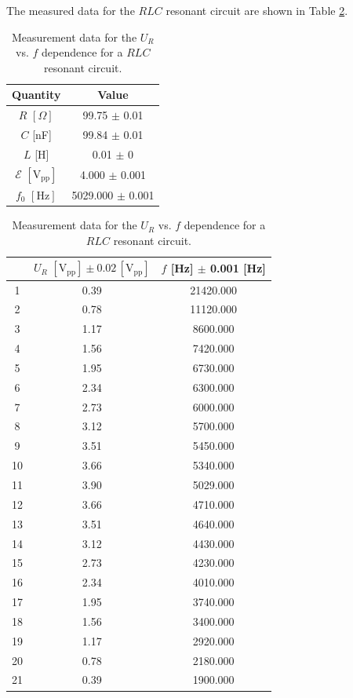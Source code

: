 \documentclass{article}
\begin{document}
The measured data for the $RLC$ resonant circuit are shown in Table \ref{TableResonant}.
\begin{table}[H]\centering
 \begin{tabular}{c|c}
    \toprule
            Quantity & Value \\
        \midrule
        $R\,\,[\Omega]$ & 99.75 $\pm$ 0.01 \\        
        $C$ [nF] & 99.84 $\pm$ 0.01 \\
        $L$ [H] & 0.01 $\pm$ 0 \\
        \midrule
        $\mathcal{E}\,\,[\text{V}_{\text{pp}}]$ & 4.000 $\pm$ 0.001    \\
        $f_0\,\,[\text{Hz}]$ & 5029.000 $\pm$ 0.001 \\
    \end{tabular}        
    
        \begin{tabular}{ccc}

        \toprule
 & $U_R\,\,[\text{V}_\text{pp}] \pm 0.02\,[\text{V}_\text{pp}]$          & $f$ [Hz] $\pm$ 0.001 [Hz] \\
        \midrule
1 & 0.39 & 21420.000 \\
2 & 0.78 & 11120.000 \\
3 & 1.17 & 8600.000 \\
4 & 1.56 & 7420.000 \\
5 & 1.95 & 6730.000 \\
6 & 2.34 & 6300.000 \\
7 & 2.73 & 6000.000 \\
8 & 3.12 & 5700.000 \\
9 & 3.51 & 5450.000 \\
10 & 3.66 & 5340.000 \\
11 & 3.90 & 5029.000 \\
12 & 3.66 & 4710.000 \\
13 & 3.51 & 4640.000 \\
14 & 3.12 & 4430.000 \\
15 & 2.73 & 4230.000 \\
16 & 2.34 & 4010.000 \\
17 & 1.95 & 3740.000 \\
18 & 1.56 & 3400.000 \\
19 & 1.17 & 2920.000 \\
20 & 0.78 & 2180.000 \\
21 & 0.39 & 1900.000 \\
        \bottomrule
    \end{tabular}
    \caption{Measurement data for the $U_R$ vs. $f$ dependence for a $RLC$ resonant circuit.}\label{TableResonant}
\end{table}
\end{document}

